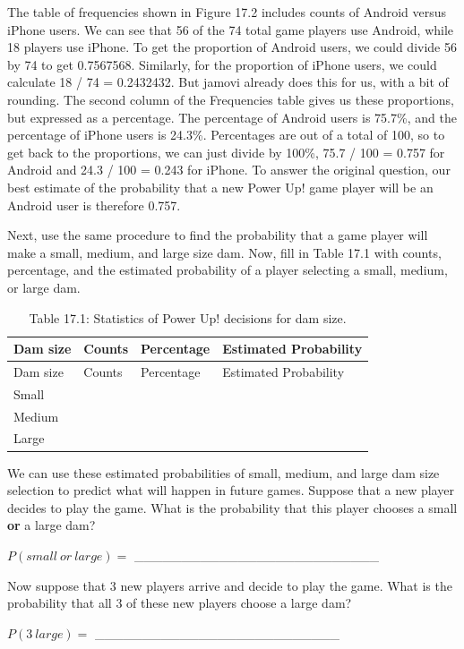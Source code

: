 \documentclass[
]{scrbook}
\begin{document}
The table of frequencies shown in Figure 17.2 includes counts of Android versus iPhone users.
We can see that 56 of the 74 total game players use Android, while 18 players use iPhone.
To get the proportion of Android users, we could divide 56 by 74 to get 0.7567568.
Similarly, for the proportion of iPhone users, we could calculate 18 / 74 = 0.2432432.
But jamovi already does this for us, with a bit of rounding.
The second column of the Frequencies table gives us these proportions, but expressed as a percentage.
The percentage of Android users is 75.7\%, and the percentage of iPhone users is 24.3\%.
Percentages are out of a total of 100, so to get back to the proportions, we can just divide by 100\%, 75.7 / 100 = 0.757 for Android and 24.3 / 100 = 0.243 for iPhone.
To answer the original question, our best estimate of the probability that a new Power Up! game player will be an Android user is therefore 0.757.

Next, use the same procedure to find the probability that a game player will make a small, medium, and large size dam.
Now, fill in Table 17.1 with counts, percentage, and the estimated probability of a player selecting a small, medium, or large dam.

\begin{longtable}[]{@{}llll@{}}
\caption{Table 17.1: Statistics of Power Up! decisions for dam size.}\tabularnewline
\toprule
Dam size & Counts & Percentage & Estimated Probability \\
\midrule
\endfirsthead
\toprule
Dam size & Counts & Percentage & Estimated Probability \\
\midrule
\endhead
Small & & & \\
Medium & & & \\
Large & & & \\
\bottomrule
\end{longtable}

We can use these estimated probabilities of small, medium, and large dam size selection to predict what will happen in future games.
Suppose that a new player decides to play the game.
What is the probability that this player chooses a small \textbf{or} a large dam?

\(P(small\:or\:large) =\) \_\_\_\_\_\_\_\_\_\_\_\_\_\_\_\_\_\_\_\_\_\_\_\_\_\_

Now suppose that 3 new players arrive and decide to play the game.
What is the probability that all 3 of these new players choose a large dam?

\(P(3\:large) =\) \_\_\_\_\_\_\_\_\_\_\_\_\_\_\_\_\_\_\_\_\_\_\_\_\_\_
\end{document}
